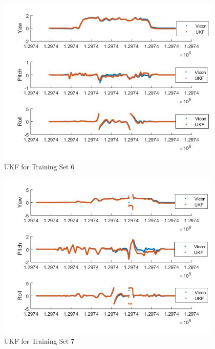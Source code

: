\documentclass[fleqn,10pt]{SelfArx} %
\begin{document}
\begin{figure}[hbtp]
\centering
\includegraphics[scale=0.45]{6.jpg}
\caption{UKF for Training Set 6}
\label{fig:6}
\end{figure}

\begin{figure}[hbtp]
\centering
\includegraphics[scale=0.45]{7.jpg}
\caption{UKF for Training Set 7}
\label{fig:7}
\end{figure}
\end{document}
